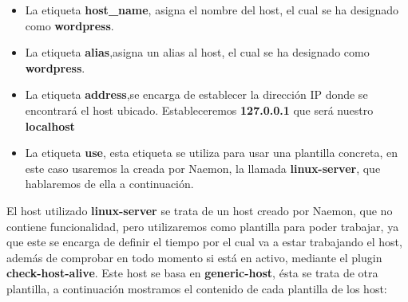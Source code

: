 \begin{itemize}
	\item La etiqueta \textbf{host\_name}, asigna el nombre del host, el cual se ha designado como \textbf{wordpress}.
	\item La etiqueta \textbf{alias},asigna un alias al host, el cual se ha designado como \textbf{wordpress}.
	\item La etiqueta \textbf{address},se encarga de establecer la dirección IP donde se encontrará el host ubicado. Estableceremos \textbf{127.0.0.1 }que será nuestro \textbf{localhost}
	\item La etiqueta \textbf{use}, esta etiqueta se utiliza para usar una plantilla concreta, en este caso usaremos la creada por Naemon, la llamada \textbf{linux-server}, que hablaremos de ella a continuación.
\end{itemize}
\newpage
El host utilizado \textbf{linux-server} se trata de un host creado por Naemon, que no contiene funcionalidad, pero utilizaremos como plantilla para poder trabajar, ya que este se encarga de definir el tiempo por el cual va a estar trabajando el host, además de comprobar en todo momento si está en activo, mediante el plugin \textbf{check-host-alive}. Este host se basa en \textbf{generic-host}, ésta se trata de otra plantilla, a continuación mostramos el contenido de cada plantilla de los host:
 

